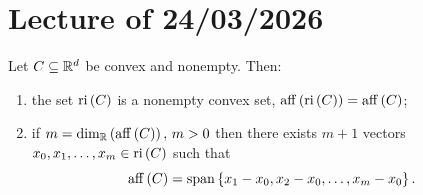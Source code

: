 \chapter{Lecture \thechapter{} of 24/03/2026}

\begin{proposition}

    Let $C \subseteq \mathbb{R}^d$ be convex and nonempty. Then: 

    \begin{enumerate}
        \item[a)] the set $\mathrm{ri}\left(C\right)$ is a nonempty convex set, $\mathrm{aff}\left(\mathrm{ri}\left(C\right)\right) = \mathrm{aff}\left(C\right)$;
        \item[b)] if $m = \mathrm{dim}_{\mathbb{R}} \left(\mathrm{aff}\left(C\right)\right), \, m>0$ then there exists $m+1$ vectors $x_0,x_1,\dots,x_m \in \mathrm{ri}\left(C\right)$ such that 
            \[ \mathrm{aff}\left(C\right) = \mathrm{span}\left\{ x_1 - x_0, x_2 - x_0, \dots, x_m - x_{0} \right\}. \]
    \end{enumerate}
    
\end{proposition}

